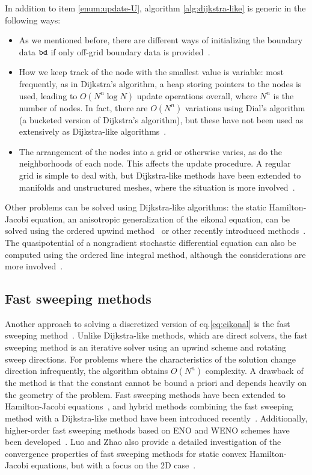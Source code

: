 \documentclass[smallcondensed]{svjour3}
\begin{document}
In addition to item \ref{enum:update-U}, algorithm
\ref{alg:dijkstra-like} is generic in the following ways:
\begin{itemize}
\item As we mentioned before, there are different ways of initializing
  the boundary data $\texttt{bd}$ if only off-grid boundary data is
  provided~\cite{chopp2001some}.
\item How we keep track of the node with the smallest value is
  variable: most frequently, as in Dijkstra's algorithm, a heap
  storing pointers to the nodes is used, leading to $O(N^n \log N)$
  update operations overall, where $N^n$ is the number of nodes. In
  fact, there are $O(N^n)$ variations using Dial's algorithm (a
  bucketed version of Dijkstra's algorithm), but these have not been
  used as extensively as Dijkstra-like
  algorithms~\cite{tsitsiklis1995efficient,kim2001calo,yatziv2006n}.
\item The arrangement of the nodes into a grid or otherwise varies, as
  do the neighborhoods of each node. This affects the update
  procedure. A regular grid is simple to deal with, but Dijkstra-like
  methods have been extended to manifolds and unstructured meshes,
  where the situation is more
  involved~\cite{kimmel1998computing,sethian2000fast,bronstein2008numerical}.
\end{itemize}
Other problems can be solved using Dijkstra-like algorithms: the
static Hamilton-Jacobi equation, an anisotropic generalization of the
eikonal equation, can be solved using the ordered upwind
method~\cite{sethian2003ordered} or other recently introduced
methods~\cite{mirebeau2014efficient,mirebeau2014anisotropic}.  The
quasipotential of a nongradient stochastic differential equation can
also be computed using the ordered line integral method, although the
considerations are more
involved~\cite{dahiya2017ordered,dahiya2018ordered,yang2019computing}.

\subsection{Fast sweeping methods} Another approach to solving a
discretized version of eq.\@ \ref{eq:eikonal} is the fast sweeping
method~\cite{tsai2003fast,zhao2005fast}. Unlike Dijkstra-like methods,
which are direct solvers, the fast sweeping method is an iterative
solver using an upwind scheme and rotating sweep directions. For
problems where the characteristics of the solution change direction
infrequently, the algorithm obtains $O(N^n)$ complexity. A drawback of
the method is that the constant cannot be bound a priori and depends
heavily on the geometry of the problem. Fast sweeping methods have
been extended to Hamilton-Jacobi
equations~\cite{tsai2003fast,kao2008legendre}, and hybrid methods
combining the fast sweeping method with a Dijkstra-like method have
been introduced
recently~\cite{chacon2012fast,chacon2015parallel}. Additionally,
higher-order fast sweeping methods based on ENO and WENO schemes have
been developed~\cite{zhang2006high}. Luo and Zhao also provide a
detailed investigation of the convergence properties of fast sweeping
methods for static convex Hamilton-Jacobi equations, but with a focus
on the 2D case~\cite{luo2016convergence}.
\end{document}

